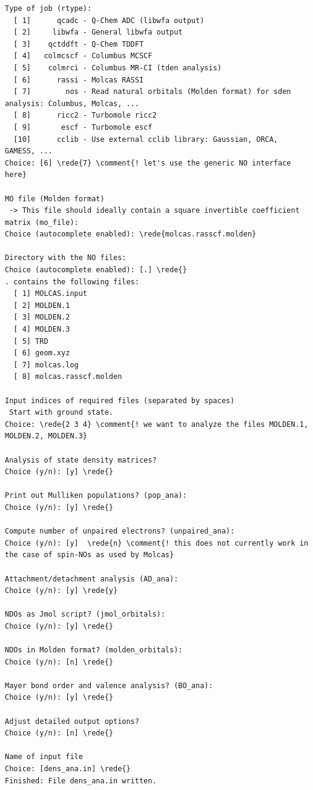 \documentclass[DIV=12,headings=normal]{scrartcl}
\newcommand{\comment}[1]{\textcolor{blue}{#1}}
\newcommand{\redl}[1]{{\textcolor{red}{\underline{#1}}}}
\newcommand{\rede}[1]{\redl{#1 <ENTER>}}
\newcounter{number}
\begin{document}
\scriptsize
\begin{Verbatim}[commandchars=\\\{\}]
Type of job (rtype):
  [ 1]      qcadc - Q-Chem ADC (libwfa output)
  [ 2]     libwfa - General libwfa output     
  [ 3]    qctddft - Q-Chem TDDFT              
  [ 4]   colmcscf - Columbus MCSCF
  [ 5]    colmrci - Columbus MR-CI (tden analysis)
  [ 6]      rassi - Molcas RASSI
  [ 7]        nos - Read natural orbitals (Molden format) for sden analysis: Columbus, Molcas, ...
  [ 8]      ricc2 - Turbomole ricc2
  [ 9]       escf - Turbomole escf
  [10]      cclib - Use external cclib library: Gaussian, ORCA, GAMESS, ...
Choice: [6] \rede{7} \comment{! let's use the generic NO interface here}

MO file (Molden format)
 -> This file should ideally contain a square invertible coefficient matrix (mo_file):
Choice (autocomplete enabled): \rede{molcas.rasscf.molden}

Directory with the NO files:
Choice (autocomplete enabled): [.] \rede{}
. contains the following files:
  [ 1] MOLCAS.input
  [ 2] MOLDEN.1
  [ 3] MOLDEN.2
  [ 4] MOLDEN.3
  [ 5] TRD
  [ 6] geom.xyz
  [ 7] molcas.log
  [ 8] molcas.rasscf.molden

Input indices of required files (separated by spaces)
 Start with ground state.
Choice: \rede{2 3 4} \comment{! we want to analyze the files MOLDEN.1, MOLDEN.2, MOLDEN.3}

Analysis of state density matrices?
Choice (y/n): [y] \rede{}

Print out Mulliken populations? (pop_ana):
Choice (y/n): [y] \rede{}

Compute number of unpaired electrons? (unpaired_ana):
Choice (y/n): [y]  \rede{n} \comment{! this does not currently work in the case of spin-NOs as used by Molcas}

Attachment/detachment analysis (AD_ana):
Choice (y/n): [y] \rede{y}

NDOs as Jmol script? (jmol_orbitals):
Choice (y/n): [y] \rede{}

NDOs in Molden format? (molden_orbitals):
Choice (y/n): [n] \rede{}

Mayer bond order and valence analysis? (BO_ana):
Choice (y/n): [y] \rede{}

Adjust detailed output options?
Choice (y/n): [n] \rede{}

Name of input file
Choice: [dens_ana.in] \rede{}
Finished: File dens_ana.in written.
\end{Verbatim}
\normalsize
\end{document}
